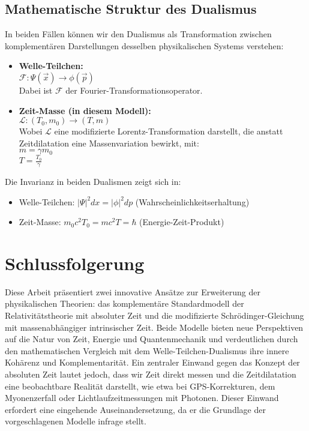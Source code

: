 \documentclass[a4paper,12pt]{article}
\begin{document}
	\subsection{Mathematische Struktur des Dualismus}
	In beiden Fällen können wir den Dualismus als Transformation zwischen komplementären Darstellungen desselben physikalischen Systems verstehen:
	\begin{itemize}
		\item \textbf{Welle-Teilchen:} \\
		\( \mathcal{F}: \Psi(\vec{x}) \rightarrow \phi(\vec{p}) \) \\
		Dabei ist \( \mathcal{F} \) der Fourier-Transformationsoperator.
		\item \textbf{Zeit-Masse (in diesem Modell):} \\
		\( \mathcal{L}: (T_0, m_0) \rightarrow (T, m) \) \\
		Wobei \( \mathcal{L} \) eine modifizierte Lorentz-Transformation darstellt, die anstatt Zeitdilatation eine Massenvariation bewirkt, mit: \\
		\( m = \gamma m_0 \) \\
		\( T = \frac{T_0}{\gamma} \)
	\end{itemize}
	Die Invarianz in beiden Dualismen zeigt sich in:
	\begin{itemize}
		\item Welle-Teilchen: \( |\Psi|^2 dx = |\phi|^2 dp \) (Wahrscheinlichkeitserhaltung)
		\item Zeit-Masse: \( m_0c^2T_0 = mc^2T = \hbar \) (Energie-Zeit-Produkt)
	\end{itemize}
	
	\section{Schlussfolgerung}
	Diese Arbeit präsentiert zwei innovative Ansätze zur Erweiterung der physikalischen Theorien: das komplementäre Standardmodell der Relativitätstheorie mit absoluter Zeit und die modifizierte Schrödinger-Gleichung mit massenabhängiger intrinsischer Zeit. Beide Modelle bieten neue Perspektiven auf die Natur von Zeit, Energie und Quantenmechanik und verdeutlichen durch den mathematischen Vergleich mit dem Welle-Teilchen-Dualismus ihre innere Kohärenz und Komplementarität. Ein zentraler Einwand gegen das Konzept der absoluten Zeit lautet jedoch, dass wir Zeit direkt messen und die Zeitdilatation eine beobachtbare Realität darstellt, wie etwa bei GPS-Korrekturen, dem Myonenzerfall oder Lichtlaufzeitmessungen mit Photonen. Dieser Einwand erfordert eine eingehende Auseinandersetzung, da er die Grundlage der vorgeschlagenen Modelle infrage stellt.
	
\end{document}
